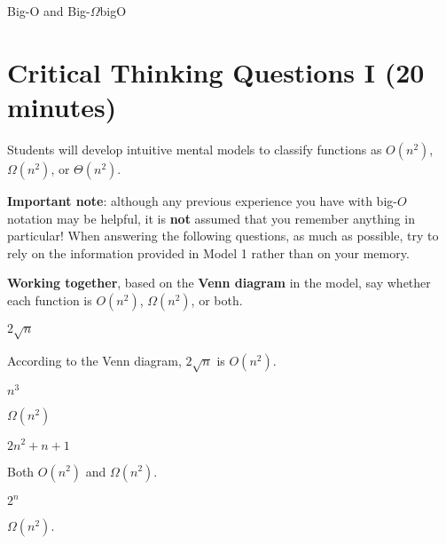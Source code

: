 \documentclass{tufte-handout}
\begin{document}
\begin{model}{Big-O and Big-$\Omega$}{bigO}
\begin{center}
\begin{minipage}{\textwidth}
\end{minipage}

\end{center}
\end{model}

\newpage
\section{Critical Thinking Questions I (20 minutes)}
\begin{objective}
Students will develop intuitive mental models to classify
  functions as $O(n^2)$, $\Omega(n^2)$, or $\Theta(n^2)$.
\end{objective}

\textbf{Important note}: although any previous experience you have
with big-$O$ notation may be helpful, it is \textbf{not} assumed that
you remember anything in particular!  When answering the following
questions, as much as possible, try to rely on the information
provided in Model 1 rather than on your memory.

\begin{questions}
\item \textbf{Working together}, based on the \textbf{Venn diagram} in
  the model, say whether each function is $O(n^2)$, $\Omega(n^2)$, or
  both. 
  \begin{subquestions}
  \item $2\sqrt n$
    \begin{answer}According to the Venn diagram, $2\sqrt n$ is $O(n^2)$.\end{answer}
  \item $n^3$
    \begin{answer}$\Omega(n^2)$\end{answer}
  \item $2n^2 + n + 1$
    \begin{answer}Both $O(n^2)$ and $\Omega(n^2)$.\end{answer}
  \item $2^n$
    \begin{answer}$\Omega(n^2)$.\end{answer}
  \end{subquestions}
\end{questions}
\end{document}
